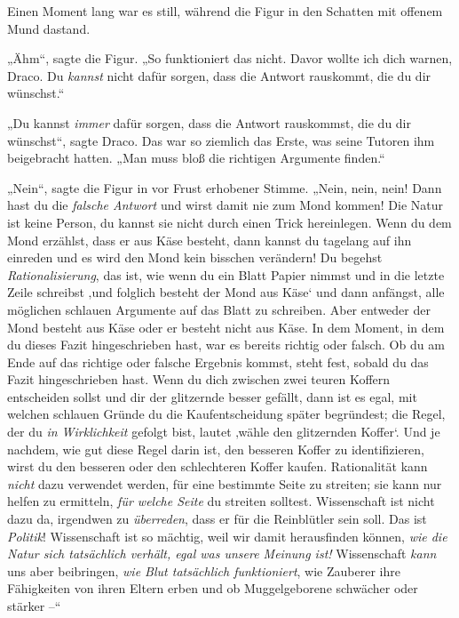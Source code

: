 {Einen Moment lang war es still, während die Figur in den Schatten mit offenem Mund dastand.

„Ähm“, sagte die Figur. „So funktioniert das nicht. Davor wollte ich dich warnen, Draco. Du \emph{kannst} nicht dafür sorgen, dass die Antwort rauskommt, die du dir wünschst.“

„Du kannst \emph{immer} dafür sorgen, dass die Antwort rauskommst, die du dir wünschst“, sagte Draco. Das war so ziemlich das Erste, was seine Tutoren ihm beigebracht hatten. „Man muss bloß die richtigen Argumente finden.“

„Nein“, sagte die Figur in vor Frust erhobener Stimme. „Nein, nein, nein! Dann hast du die \emph{falsche Antwort} und wirst damit nie zum Mond kommen! Die Natur ist keine Person, du kannst sie nicht durch einen Trick hereinlegen. Wenn du dem Mond erzählst, dass er aus Käse besteht, dann kannst du tagelang auf ihn einreden und es wird den Mond kein bisschen verändern! Du begehst \emph{Rationalisierung}, das ist, wie wenn du ein Blatt Papier nimmst und in die letzte Zeile schreibst ‚und folglich besteht der Mond aus Käse` und dann anfängst, alle möglichen schlauen Argumente auf das Blatt zu schreiben. Aber entweder der Mond besteht aus Käse oder er besteht nicht aus Käse. In dem Moment, in dem du dieses Fazit hingeschrieben hast, war es bereits richtig oder falsch. Ob du am Ende auf das richtige oder falsche Ergebnis kommst, steht fest, sobald du das Fazit hingeschrieben hast. Wenn du dich zwischen zwei teuren Koffern entscheiden sollst und dir der glitzernde besser gefällt, dann ist es egal, mit welchen schlauen Gründe du die Kaufentscheidung später begründest; die Regel, der du \emph{in Wirklichkeit} gefolgt bist, lautet ‚wähle den glitzernden Koffer`. Und je nachdem, wie gut diese Regel darin ist, den besseren Koffer zu identifizieren, wirst du den besseren oder den schlechteren Koffer kaufen. Rationalität kann \emph{nicht} dazu verwendet werden, für eine bestimmte Seite zu streiten; sie kann nur helfen zu ermitteln, \emph{für welche Seite} du streiten solltest. Wissenschaft ist nicht dazu da, irgendwen zu \emph{überreden}, dass er für die Reinblütler sein soll. Das ist \emph{Politik}! Wissenschaft ist so mächtig, weil wir damit herausfinden können, \emph{wie die Natur sich tatsächlich verhält, egal was unsere Meinung ist!} Wissenschaft \emph{kann} uns aber beibringen, \emph{wie Blut tatsächlich funktioniert}, wie Zauberer ihre Fähigkeiten von ihren Eltern erben und ob Muggelgeborene schwächer oder stärker --“

}
